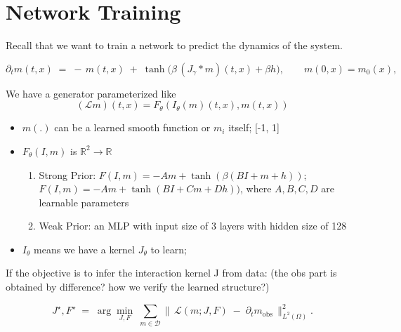 \documentclass[11pt,a4paper]{article}
\begin{document}
\section{Network Training}

Recall that we want to train a network to predict the dynamics of the system.

\begin{equation}\label{eq:nonlocal-recall}
\partial_t m(t,x) \;=\; -\,m(t,x)\;+\;\tanh\!\Big(\beta\, (J_\gamma * m)(t,x) + \beta h\Big), \qquad m(0,x)=m_0(x),
\end{equation}



We have a generator parameterized like
\begin{equation}
    (\mathcal{L}m)(t,x) = F_\theta(I_\theta (m)(t,x), m(t,x))
\end{equation}

\begin{itemize}
    \item $m(.)$ can be a learned smooth function or $m_i$ itself; [-1, 1]
    \item $F_\theta(I,m)$ is $\mathbb{R}^2 \to \mathbb{R}$
    \begin{enumerate}
        \item Strong Prior: $F(I, m)=-Am+\tanh(\beta(BI+m+h))$; $F(I, m)=-Am+\tanh(BI+Cm+Dh))$, where $A,B,C,D$ are learnable parameters
        \item Weak Prior: an MLP with input size of 3 layers with hidden size of 128
    \end{enumerate}
    \item $I_\theta$ means we have a kernel $J_\theta$ to learn;
\end{itemize}


If the objective is to infer the interaction kernel J from data: 
(the obs part is obtained by difference? how we verify the learned structure?)

\begin{equation}
    J^\star, F^\star \;=\; \arg\min_{J, F}\;
\sum_{m \in \mathcal{D}}
\bigl\|\, \mathcal{L}(m;J,F)\;-\;\partial_t m_{\mathrm{obs}} \,\bigr\|_{L^2(\Omega)}^{2}.

\end{equation}


\nocite{*}
\printbibliography
\end{document}
